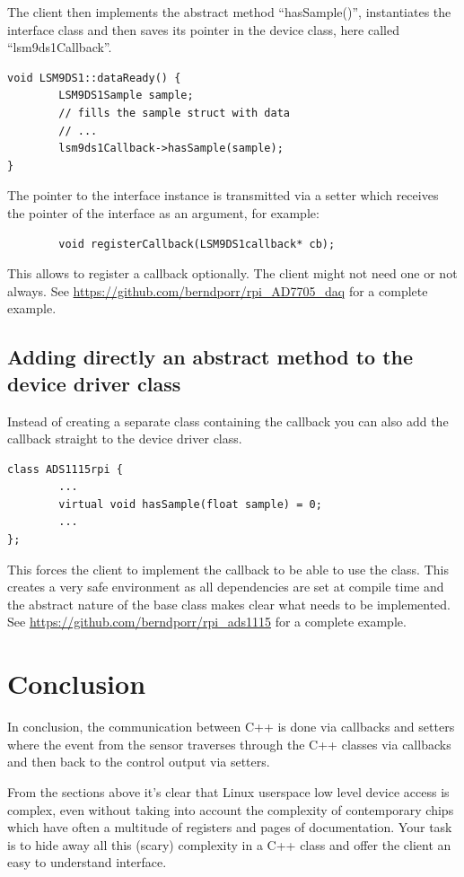 \documentclass[12pt]{report}
\begin{document}
The client then implements the abstract method ``hasSample()'', instantiates
the interface class and then saves its pointer in the device class, here called ``lsm9ds1Callback''.
\begin{verbatim}
void LSM9DS1::dataReady() {
        LSM9DS1Sample sample;
        // fills the sample struct with data
        // ...
        lsm9ds1Callback->hasSample(sample);
}
\end{verbatim}
The pointer to the interface instance is transmitted via a setter which
receives the pointer of the interface as an argument, for example:
\begin{verbatim}
        void registerCallback(LSM9DS1callback* cb);
\end{verbatim}
This allows to register a callback optionally. The client might not need
one or not always.
See
\url{https://github.com/berndporr/rpi_AD7705_daq}
for a complete example.

\subsection{Adding directly an abstract method to the device driver class}
Instead of creating a separate class containing the callback you
can also add the callback straight to the device driver class.
\begin{verbatim}
class ADS1115rpi {
        ...
        virtual void hasSample(float sample) = 0;
        ...
};
\end{verbatim}
This forces the client to implement the callback to be able to use
the class. This creates a very safe environment as all dependencies
are set at compile time and the abstract nature of the base class
makes clear what needs to be implemented.
See
\url{https://github.com/berndporr/rpi_ads1115} for a complete example.


\section{Conclusion}
In conclusion, the communication between C++ is done via callbacks and
setters where the event from the sensor traverses through the C++
classes via callbacks and then back to the control output via setters.

From the sections above it's clear that Linux userspace low level
device access is complex, even without taking into account the
complexity of contemporary chips which have often a multitude of
registers and pages of documentation. Your task is to hide away
all this (scary) complexity in a C++ class and offer the client
an easy to understand interface.
\end{document}
